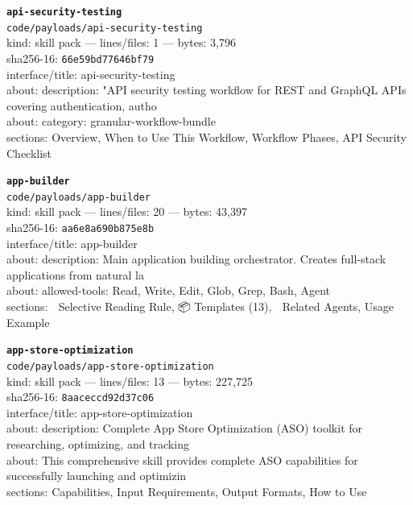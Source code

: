 \noindent\textbf{\texttt{api-security-testing}}\\
\texttt{code/payloads/api-security-testing}\\
kind: skill pack --- lines/files: 1 --- bytes: 3,796\\
sha256-16: \texttt{66e59bd77646bf79}\\
interface/title: api-security-testing\\
about: description: "API security testing workflow for REST and GraphQL APIs covering authentication, autho\\
about: category: granular-workflow-bundle\\
sections: Overview, When to Use This Workflow, Workflow Phases, API Security Checklist\\
\vspace*{6.0pt}
\newpage

\noindent\textbf{\texttt{app-builder}}\\
\texttt{code/payloads/app-builder}\\
kind: skill pack --- lines/files: 20 --- bytes: 43,397\\
sha256-16: \texttt{aa6e8a690b875e8b}\\
interface/title: app-builder\\
about: description: Main application building orchestrator. Creates full-stack applications from natural la\\
about: allowed-tools: Read, Write, Edit, Glob, Grep, Bash, Agent\\
sections: 🎯 Selective Reading Rule, 📦 Templates (13), 🔗 Related Agents, Usage Example\\
\vspace*{6.0pt}

\noindent\textbf{\texttt{app-store-optimization}}\\
\texttt{code/payloads/app-store-optimization}\\
kind: skill pack --- lines/files: 13 --- bytes: 227,725\\
sha256-16: \texttt{8aaceccd92d37c06}\\
interface/title: app-store-optimization\\
about: description: Complete App Store Optimization (ASO) toolkit for researching, optimizing, and tracking\\
about: This comprehensive skill provides complete ASO capabilities for successfully launching and optimizin\\
sections: Capabilities, Input Requirements, Output Formats, How to Use\\
\vspace*{6.0pt}

